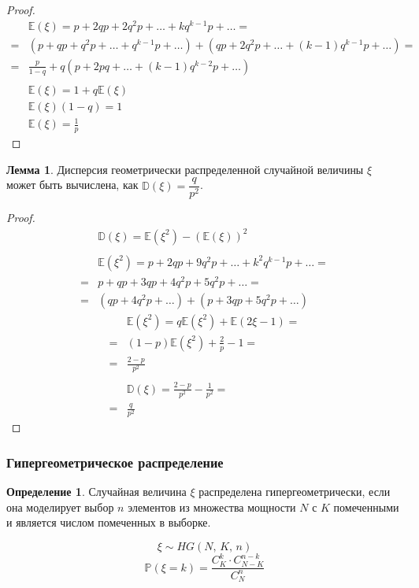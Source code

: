 \documentclass[12pt]{article}
\theoremstyle{definition}
\newtheorem{lemma}[theorem]{Лемма}
\newtheorem{definition}{Определение}
\newcommand{\E}{\mathbb{E}}
\newcommand{\D}{\mathbb{D}}
\newcommand{\prob}{\mathbb{P}}
\begin{document}
\begin{proof}
    \begin{align*}
        &\E(\xi)=p+2qp+2q^2p+\ldots+kq^{k-1}p+\ldots=\\
        =&(p+qp+q^2p+\ldots+q^{k-1}p+\ldots)+(qp+2q^2p+\ldots+(k-1)q^{k-1}p+\ldots)=\\
        =&\frac{p}{1-q}+q(p+2pq+\ldots+(k-1)q^{k-2}p+\ldots)\\\\
        &\E(\xi)=1+q\E(\xi)\\
        &\E(\xi)(1-q)=1\\
        &\E(\xi)=\frac{1}{p}
    \end{align*}
\end{proof}

\begin{lemma}
    Дисперсия геометрически распределенной случайной величины $\xi$ может быть вычислена, как $\D(\xi)=\dfrac{q}{p^2}$.
\end{lemma}

\begin{proof}
    \begin{align*}
        &\D(\xi)=\E(\xi^2)-(\E(\xi))^2\\\\
        &\E(\xi^2)=p+2qp+9q^2p+\ldots+k^2q^{k-1}p+\ldots=\\
        =&p+qp+3qp+4q^2p+5q^2p+\ldots=\\
        =&(qp+4q^2p+\ldots)+(p+3qp+5q^2p+\ldots)
    \end{align*}
    \begin{align*}
        &\E(\xi^2)=q\E(\xi^2)+\E(2\xi-1)=\\
        =&(1-p)\E(\xi^2)+\frac{2}{p}-1=\\
        =&\frac{2-p}{p^2}\\\\
        &\D(\xi)=\frac{2-p}{p^2}-\frac{1}{p^2}=\\
        =&\frac{q}{p^2}
    \end{align*}
\end{proof}

\subsubsection{Гипергеометрическое распределение}
\begin{definition}
    Случайная величина $\xi$ распределена гипергеометрически, если она моделирует выбор $n$ элементов из множества мощности $N$ с $K$ помеченными и является числом помеченных в выборке.
\end{definition}
$$\xi \sim HG(N,\,K,\,n)$$
$$\prob(\xi=k)=\frac{C_K^k\cdot C_{N-K}^{n-k}}{C_N^n}$$
\end{document}
